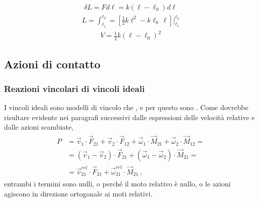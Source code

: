 \documentclass[letterpaper,10pt,italian]{jupyterBook}
\begin{document}
\sphinxAtStartPar
{} 
\begin{equation*}
\begin{split}\delta L =  F d \ell = k (\ell - \ell_0) d \ell\end{split}
\end{equation*}\begin{equation*}
\begin{split}L = \int_{\ell_1}^{\ell_2} = \left[ \frac{1}{2} k \ell^2 - k \ell_0 \, \ell \right]\bigg|_{\ell_1}^{\ell_2}\end{split}
\end{equation*}\begin{equation*}
\begin{split}V = \frac{1}{2} k (\ell - \ell_0)^2\end{split}
\end{equation*}

\subsection{Azioni di contatto}
\label{\detokenize{ch/mechanics/actions-examples:azioni-di-contatto}}

\subsubsection{Reazioni vincolari di vincoli ideali}
\label{\detokenize{ch/mechanics/actions-examples:reazioni-vincolari-di-vincoli-ideali}}
\sphinxAtStartPar
I vincoli ideali sono modelli di vincolo che , e per questo sono . Come dovrebbe risultare evidente nei paragrafi successivi dalle espressioni delle velocità relative e dalle azioni scambiate,
\begin{equation*}
\begin{split}\begin{aligned}
P & = \vec{v}_1     \cdot \vec{F}_{21} + \vec{v}_2     \cdot \vec{F}_{12} 
    + \vec{\omega}_1 \cdot \vec{M}_{21} + \vec{\omega}_2 \cdot \vec{M}_{12} = \\ 
  & = ( \vec{v}_1 - \vec{v}_2 ) \cdot \vec{F}_{21}
    + ( \vec{\omega}_1 - \vec{\omega}_2 ) \cdot \vec{M}_{21} = \\ 
  & = \vec{v}^{rel}_{21} \cdot \vec{F}_{21}
    + \vec{\omega}^{rel}_{21} \cdot \vec{M}_{21} \ ,
\end{aligned}\end{split}
\end{equation*}
\sphinxAtStartPar
entrambi i termini sono nulli, o perché il moto relativo è nullo, o le azioni agiscono in direzione ortogonale ai moti relativi.
\end{document}
